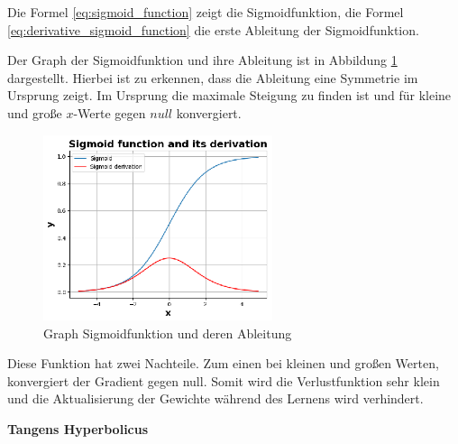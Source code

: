 Die Formel \ref{eq:sigmoid_function} zeigt die Sigmoidfunktion, die Formel \ref{eq:derivative_sigmoid_function} die erste Ableitung der Sigmoidfunktion.



Der Graph der Sigmoidfunktion und ihre Ableitung ist in Abbildung \ref{img:sig_func_graph} dargestellt. Hierbei ist zu erkennen, dass die Ableitung eine Symmetrie im Ursprung zeigt. Im Ursprung die maximale Steigung zu finden ist und für kleine und große $x$-Werte gegen $null$ konvergiert.

\begin{figure}[!ht]
	\includegraphics[width=0.6\textwidth]{content/chapter_basics/plots/sigmoid_func_plot.eps}
	\centering
	\caption{Graph Sigmoidfunktion und deren Ableitung}
	\label{img:sig_func_graph}
\end{figure}

Diese Funktion hat zwei Nachteile. Zum einen bei kleinen und großen Werten, konvergiert der Gradient gegen null. Somit wird die Verlustfunktion sehr klein und die Aktualisierung der Gewichte während des Lernens wird verhindert.\vspace{0.2cm}

%
\textbf{Tangens Hyperbolicus}\vspace{0.2cm}

